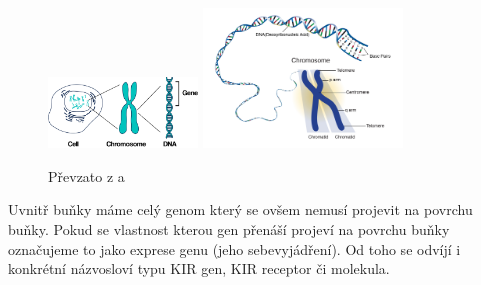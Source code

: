\documentclass[czech,DP]{thesiskiv}
\numberwithin{equation}{section}
\begin{document}
\begin{figure}[H]		
		\centering
		\includegraphics[width=150px]{./img/lidska_bunka.png}
		\includegraphics[width=200px]{./img/chromosome.jpg}
		\caption{Převzato z \cite{human_cell} a \cite{chromosome_structure}}
		\label{fig:chrmosome}
\end{figure}

\noindent
Uvnitř buňky máme celý genom který se ovšem nemusí projevit na povrchu buňky. Pokud se vlastnost kterou gen přenáší projeví na povrchu buňky označujeme to jako exprese genu (jeho sebevyjádření). Od toho se odvíjí i konkrétní názvosloví typu KIR gen, KIR receptor či molekula.
\end{document}
